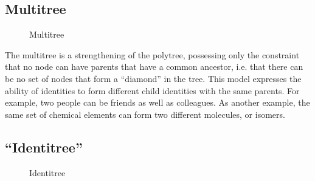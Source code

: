 \documentclass[pra,twocolumn,groupedaddress,10pt]{revtex4}
\theoremstyle{definition}
\begin{document}
\subsection{Multitree} \label{sec:multitree}

\begin{figure}[htp]
\centering
{}
\caption{\label{fig:multitree}Multitree}
\end{figure}

The multitree\cite{multitree} is a strengthening of the polytree, possessing only the constraint that no node can have parents that have a common ancestor, i.e. that there can be no set of nodes that form a ``diamond'' in the tree. This model expresses the ability of identities to form different child identities with the same parents. For example, two people can be friends as well as colleagues. As another example, the same set of chemical elements can form two different molecules, or isomers.

\subsection{``Identitree''} \label{sec:identitree}

\begin{figure}[htp]
\centering
{}
\caption{\label{fig:identitree}Identitree}
\end{figure}
\end{document}
